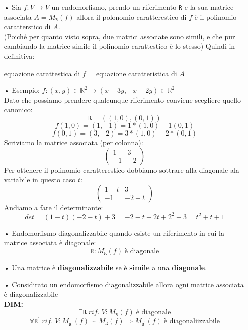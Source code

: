 \begin{itemize}
\item[•] Sia $f:V \rightarrow V$ un endomorfismo, prendo un riferimento $\mathtt{R}$ e la sua matrice associata $A=M_{\mathtt{R}}(f)$ allora il polonomio caratterestico di $f$ è il polinomio caratterstico di $A$.\\
(Poiché per quanto visto sopra, due matrici associate sono simili, e che pur cambiando la matrice simile il polinomio carattestico è lo stesso)
Quindi in definitiva:

\begin{center}
equazione carattestica di $f$ = equazione caratteristica di $A$
\end{center}

\subitem • Esempio: $f:(x,y) \in \mathbb{R}^2 \rightarrow (x+3y,-x-2y) \in \mathbb{R}^2$\\
Dato che possiamo prendere qualcunque riferimento conviene scegliere quello canonico:
$$ \mathtt{R}=((1,0),(0,1)) $$
$$ f(1,0) = (1,-1) = 1*(1,0)-1(0,1)$$
$$ f(0,1) = (3,-2) = 3*(1,0)-2*(0,1)$$
Scriviamo la matrice associata (per colonna):
$$ 
\begin{pmatrix}
1 & 3 \\ -1 & -2
\end{pmatrix}
$$
Per ottenere il polinomio caratterestico dobbiamo sottrare alla diagonale ala variabile in questo caso $t$:
$$ 
\begin{pmatrix}
1-t & 3 \\ -1 & -2-t
\end{pmatrix}
$$
Andiamo a fare il determinante:
$$ det = (1-t)(-2-t) +3 = -2-t+2t+2^2+3 = t^2+t+1 $$

\item[•] Endomorfismo diagonalizzabile quando esiste un riferimento in cui la matrice associata è diagonale:
$$ \mathtt{R}: M_{\mathtt{R}}(f) \; \text{è diagonale} $$

\item[•] Una matrice è \textbf{diagonalizzabile} se è \textbf{simile} a una \textbf{diagonale}. 

\item[•] Considirato un endomorfismo diagonalizzabile allora ogni matrice associata è diagonalizzabile\\
\textbf{DIM:}
$$ \exists \mathtt{R} \; rif. \; V: M_{\mathtt{R}}(f) \; \text{è diagonale} $$
$$ \forall \mathtt{R}^{\prime} \; rif. \; V: M_{\mathtt{R}^{\prime}}(f) \sim M_{\mathtt{R}}(f) \Rightarrow M_{\mathtt{R}^{\prime}}(f) \; \text{è diagonaliizzabile} $$


\end{itemize}
